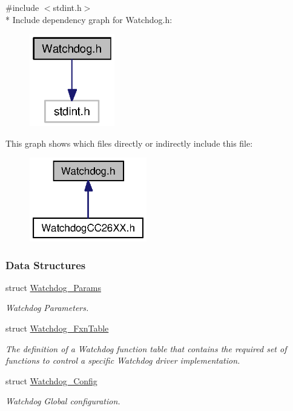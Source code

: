 {\ttfamily \#include $<$stdint.\+h$>$}\\*
Include dependency graph for Watchdog.\+h\+:
\nopagebreak
\begin{figure}[H]
\begin{center}
\leavevmode
\includegraphics[width=105pt]{_watchdog_8h__incl}
\end{center}
\end{figure}
This graph shows which files directly or indirectly include this file\+:
\nopagebreak
\begin{figure}[H]
\begin{center}
\leavevmode
\includegraphics[width=145pt]{_watchdog_8h__dep__incl}
\end{center}
\end{figure}
\subsubsection*{Data Structures}
\begin{DoxyCompactItemize}
\item 
struct \hyperlink{struct_watchdog___params}{Watchdog\+\_\+\+Params}
\begin{DoxyCompactList}\small\item\em Watchdog Parameters. \end{DoxyCompactList}\item 
struct \hyperlink{struct_watchdog___fxn_table}{Watchdog\+\_\+\+Fxn\+Table}
\begin{DoxyCompactList}\small\item\em The definition of a Watchdog function table that contains the required set of functions to control a specific Watchdog driver implementation. \end{DoxyCompactList}\item 
struct \hyperlink{struct_watchdog___config}{Watchdog\+\_\+\+Config}
\begin{DoxyCompactList}\small\item\em Watchdog Global configuration. \end{DoxyCompactList}\end{DoxyCompactItemize}
